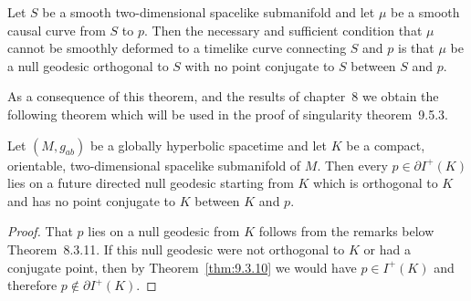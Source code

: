 \begin{theorem}\label{thm:9.3.10}
Let \(S\) be a smooth two-dimensional spacelike submanifold and let \(\mu\) be
a smooth causal curve from \(S\) to \(p\). Then the necessary and sufficient
condition that \(\mu\) cannot be smoothly deformed to a timelike curve connecting
\(S\) and \(p\) is that \(\mu\) be a null geodesic orthogonal to \(S\) with no point
conjugate to \(S\) between \(S\) and \(p\).
\end{theorem}

As a consequence of this theorem, and the results of chapter~8 we obtain the
following theorem which will be used in the proof of singularity theorem~9.5.3.

\begin{theorem}\label{thm:9.3.11}
Let \((M,g_{ab})\) be a globally hyperbolic spacetime and let \(K\) be a compact,
orientable, two-dimensional spacelike submanifold of \(M\). Then every
\(p\in\partial I^+(K)\) lies on a future directed null geodesic starting from \(K\)
which is orthogonal to \(K\) and has no point conjugate to \(K\) between \(K\)
and \(p\).
\end{theorem}

\begin{proof}
That \(p\) lies on a null geodesic from \(K\) follows from the remarks below
Theorem~8.3.11. If this null geodesic were not orthogonal to \(K\) or had a
conjugate point, then by Theorem~\ref{thm:9.3.10} we would have
\(p\in I^+(K)\) and therefore \(p\notin\partial I^+(K)\).
\end{proof}
